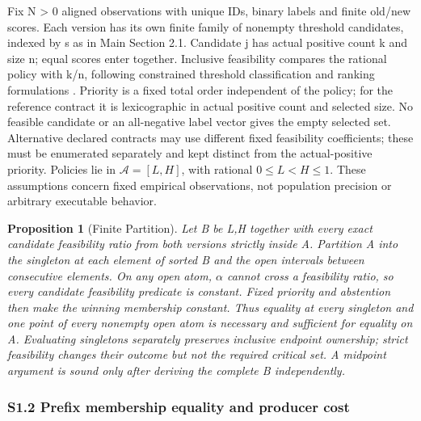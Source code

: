 \documentclass[11pt,a4paper]{article}
\theoremstyle{plain}
\newtheorem{proposition}{Proposition}
\theoremstyle{definition}
\theoremstyle{remark}
\begin{document}
Fix N > 0 aligned observations with unique IDs, binary labels and finite old/new scores. Each version has its own finite family of nonempty threshold candidates, indexed by s as in Main Section 2.1. Candidate j has actual positive count k and size n; equal scores enter together. Inclusive feasibility compares the rational policy with k/n, following constrained threshold classification and ranking formulations \cite{rath2022optimizing,mackey2018constrained,tasche2018plugin}. Priority is a fixed total order independent of the policy; for the reference contract it is lexicographic in actual positive count and selected size. No feasible candidate or an all-negative label vector gives the empty selected set. Alternative declared contracts may use different fixed feasibility coefficients; these must be enumerated separately and kept distinct from the actual-positive priority. Policies lie in $\mathcal{A} = [L, H]$, with rational $0 \le L < H \le 1$. These assumptions concern fixed empirical observations, not population precision or arbitrary executable behavior.

\begin{proposition}[Finite Partition]\label{prop:s1}
Let B be {L,H} together with every exact candidate feasibility ratio from both versions strictly inside A. Partition A into the singleton at each element of sorted B and the open intervals between consecutive elements. On any open atom, $\alpha$ cannot cross a feasibility ratio, so every candidate feasibility predicate is constant. Fixed priority and abstention then make the winning membership constant. Thus equality at every singleton and one point of every nonempty open atom is necessary and sufficient for equality on A. Evaluating singletons separately preserves inclusive endpoint ownership; strict feasibility changes their outcome but not the required critical set. A midpoint argument is sound only after deriving the complete B independently.
\end{proposition}

\subsubsection*{S1.2 Prefix membership equality and producer cost}\label{sec:s1_2}
\end{document}
